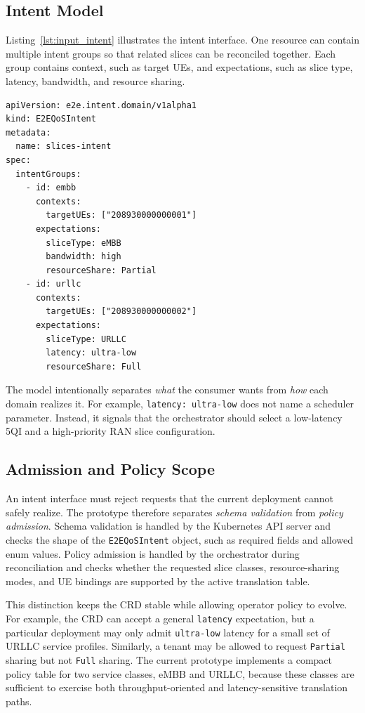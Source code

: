 \subsection{Intent Model}

Listing~\ref{lst:input_intent} illustrates the intent interface. One resource can contain multiple intent groups so that related slices can be reconciled together. Each group contains context, such as target UEs, and expectations, such as slice type, latency, bandwidth, and resource sharing.

\begin{lstlisting}[caption={Example \texttt{E2EQoSIntent} submitted by a consumer}, label={lst:input_intent}]
apiVersion: e2e.intent.domain/v1alpha1
kind: E2EQoSIntent
metadata:
  name: slices-intent
spec:
  intentGroups:
    - id: embb
      contexts:
        targetUEs: ["208930000000001"]
      expectations:
        sliceType: eMBB
        bandwidth: high
        resourceShare: Partial
    - id: urllc
      contexts:
        targetUEs: ["208930000000002"]
      expectations:
        sliceType: URLLC
        latency: ultra-low
        resourceShare: Full
\end{lstlisting}

The model intentionally separates \emph{what} the consumer wants from \emph{how} each domain realizes it. For example, \texttt{latency: ultra-low} does not name a scheduler parameter. Instead, it signals that the orchestrator should select a low-latency 5QI and a high-priority RAN slice configuration.

\subsection{Admission and Policy Scope}
\label{subsec:admission}

An intent interface must reject requests that the current deployment cannot safely realize. The prototype therefore separates \emph{schema validation} from \emph{policy admission}. Schema validation is handled by the Kubernetes API server and checks the shape of the \texttt{E2EQoSIntent} object, such as required fields and allowed enum values. Policy admission is handled by the orchestrator during reconciliation and checks whether the requested slice classes, resource-sharing modes, and UE bindings are supported by the active translation table.

This distinction keeps the CRD stable while allowing operator policy to evolve. For example, the CRD can accept a general \texttt{latency} expectation, but a particular deployment may only admit \texttt{ultra-low} latency for a small set of URLLC service profiles. Similarly, a tenant may be allowed to request \texttt{Partial} sharing but not \texttt{Full} sharing. The current prototype implements a compact policy table for two service classes, eMBB and URLLC, because these classes are sufficient to exercise both throughput-oriented and latency-sensitive translation paths.

